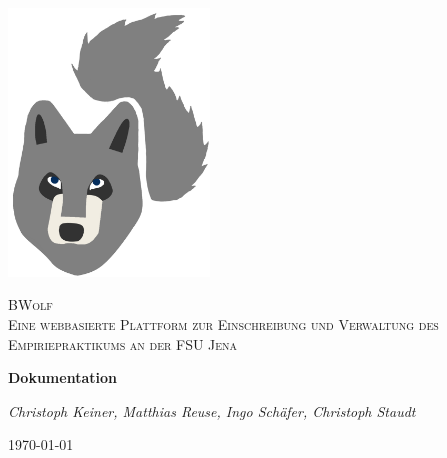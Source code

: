 \documentclass[12pt,a4paper]{report}
\begin{document}
    \onehalfspacing
    
    \begin{titlepage}
        \centering
        \includegraphics[width=0.4\textwidth]{./LogoSoFar.png}\par\vspace{1cm}
        {\scshape \LARGE BWolf \\ \Large Eine webbasierte Plattform zur
            Einschreibung und Verwaltung des
            Empiriepraktikums an der FSU Jena\par}
        \vspace{1.5cm}
        {\huge\bfseries Dokumentation\par}
        \vspace{1.5cm}
        {\large\itshape Christoph Keiner, Matthias Reuse, Ingo Schäfer, Christoph Staudt\par}
        \vspace{1.0cm}
        {\large \today\par}
    \end{titlepage}

    \tableofcontents 
    \clearpage
    
    
    
    
    
    
    
    
    
    
    
    
\end{document}
